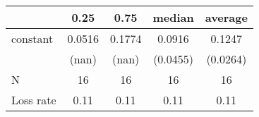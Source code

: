\begin{tabular}{lcccc}
\hline
          &  0.25  &  0.75  &  median  & average   \\
\midrule
\midrule
constant  & 0.0516 & 0.1774 & 0.0916   & 0.1247    \\
          & (nan)  & (nan)  & (0.0455) & (0.0264)  \\
N         & 16     & 16     & 16       & 16        \\
Loss rate & 0.11   & 0.11   & 0.11     & 0.11      \\
\hline
\end{tabular}
